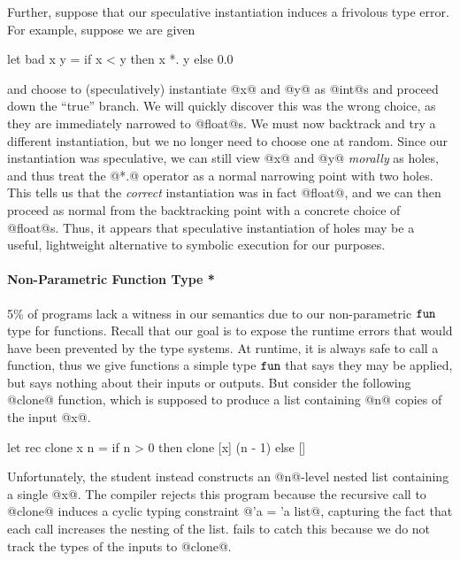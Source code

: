 Further, suppose that our speculative instantiation induces a frivolous
type error.
%
For example, suppose we are given
%
\begin{code}
  let bad x y =
    if x < y then
      x *. y
    else
      0.0
\end{code}
%
and choose to (speculatively) instantiate @x@ and @y@ as @int@s and proceed
down the ``true'' branch.
%
We will quickly discover this was the wrong choice, as they are immediately
narrowed to @float@s.
%
We must now backtrack and try a different instantiation, but we no
longer need to choose one at random.
%
Since our instantiation was speculative, we can still view @x@ and @y@
\emph{morally} as holes, and thus treat the @*.@ operator as a normal
narrowing point with two holes.
%
This tells us that the \emph{correct} instantiation was in fact @float@,
and we can then proceed as normal from the backtracking point with a
concrete choice of @float@s.
%
Thus, it appears that speculative instantiation of holes may be a
useful, lightweight alternative to symbolic execution for our purposes.



\paragraph{Non-Parametric Function Type *}
%
5\% of programs lack a witness in our semantics due to our
non-parametric $\mathtt{fun}$ type for functions.
%
Recall that our goal is to expose the runtime errors that would have
been prevented by the type systems.
%
At runtime, it is always safe to call a function, thus we give functions
a simple type $\mathtt{fun}$ that says they may be applied, but says nothing
about their inputs or outputs.
%
But consider the following @clone@ function, which is supposed to
produce a list containing @n@ copies of the input @x@.
%
%
\begin{code}
  let rec clone x n =
    if n > 0 then
      clone [x] (n - 1)
    else
      []
\end{code}
%
Unfortunately, the student instead constructs an @n@-level nested list
containing a single @x@.
%
The \ocaml compiler rejects this program because the recursive call to
@clone@ induces a cyclic typing constraint @'a = 'a list@, capturing the
fact that each call increases the nesting of the list.
%
\toolname fails to catch this because we do not track the types of the
inputs to @clone@.

